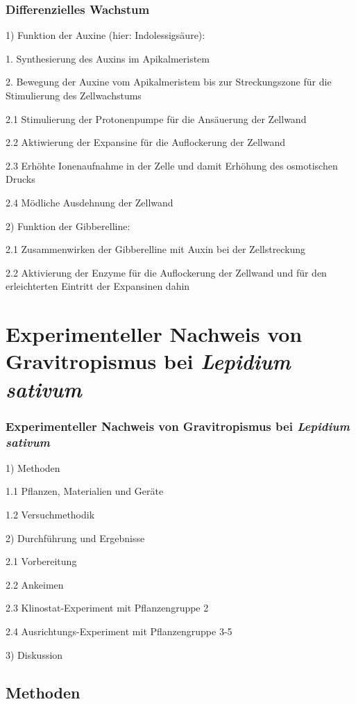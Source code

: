 \documentclass[aspectratio=169]{beamer}
\begin{document}
	\begin{frame}
\frametitle{Differenzielles Wachstum}

 1) Funktion der Auxine (hier: Indolessigsäure): 
 
 1. Synthesierung des Auxins im Apikalmeristem
 
 2. Bewegung der Auxine vom Apikalmeristem bis zur Streckungszone für die Stimulierung des Zellwachstums
 
 2.1 Stimulierung der Protonenpumpe für die Ansäuerung der Zellwand 
 
 2.2 Aktiwierung der Expansine für die Auflockerung der Zellwand
 
 2.3 Erhöhte Ionenaufnahme in der Zelle und damit Erhöhung des osmotischen Drucks
 
 2.4 Mödliche Ausdehnung der Zellwand
 
 2) Funktion der Gibberelline:
 
 2.1 Zusammenwirken der Gibberelline mit Auxin bei der Zellstreckung
 
 2.2 Aktivierung der Enzyme für die Auflockerung der Zellwand und für den erleichterten Eintritt der Expansinen dahin
 
 
 
 
\end{frame}
	
	\section{Experimenteller Nachweis von Gravitropismus bei \protect\emph{Lepidium sativum}}
	
	\begin{frame}
		\frametitle{Experimenteller Nachweis von Gravitropismus bei \protect\emph{Lepidium sativum}}
		
		1) Methoden
		
		1.1 Pflanzen, Materialien und Geräte
		
		1.2 Versuchmethodik
		
		2) Durchführung und Ergebnisse
		
		2.1 Vorbereitung 
		
		2.2 Ankeimen 
		
		2.3 Klinostat-Experiment mit Pflanzengruppe 2
		
		2.4 Ausrichtungs-Experiment mit Pflanzengruppe 3-5
		
		3) Diskussion
		
	\end{frame}	
	
	\subsection{Methoden}
	
\end{document}
